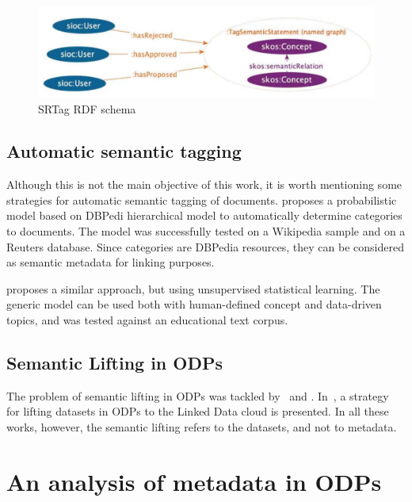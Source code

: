 \begin{figure}[tb]
\begin{center}
\includegraphics[width=\columnwidth]{images/SRTag.png}
\caption{SRTag RDF schema \cite{Limpens2013}}
\label{fig:srtag}
\end{center}
\end{figure}

\subsection{Automatic semantic tagging}
\label{sec:automatic_semtags}
Although this is not the main objective of this work, it is worth mentioning some strategies for automatic semantic tagging of documents.
 proposes a probabilistic model based on DBPedi hierarchical model to automatically determine categories to documents.
The model was successfully tested on a Wikipedia sample and on a Reuters database.
Since categories are DBPedia resources, they can be considered as semantic metadata for linking purposes.

 proposes a similar approach, but using unsupervised statistical learning.
The generic model can be used both with human-defined concept and data-driven topics, and was tested against an educational text corpus.

\subsection{Semantic Lifting in ODPs}
The problem of semantic lifting in ODPs was tackled by~ and . 
In~, a strategy for lifting datasets in ODPs to the Linked Data cloud is presented. 
In all these works, however, the semantic lifting refers to the datasets, and not to metadata.

\section{An analysis of metadata in ODPs}
\label{sec:analysis} 

